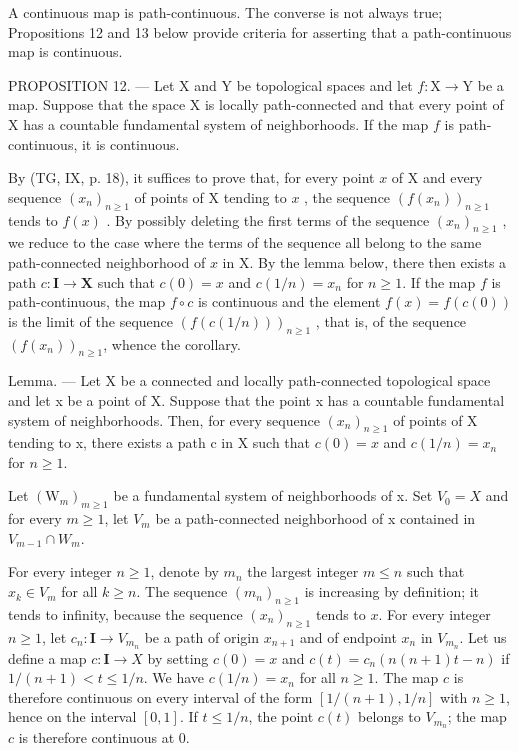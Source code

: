 A continuous map is path-continuous. The converse is not always true; Propositions 12 and 13 below provide criteria for asserting that a path-continuous map is continuous.

PROPOSITION 12. --- Let X and Y be topological spaces and let \(f: \mathrm{X} \to \mathrm{Y}\) be a map. Suppose that the space X is locally path-connected and that every point of X has a countable fundamental system of neighborhoods. If the map \(f\) is path-continuous, it is continuous.

By (TG, IX, p. 18), it suffices to prove that, for every point \(x\) of X and every sequence \((x_n)_{n \geqslant 1}\) of points of X tending to \(x\) , the sequence \((f(x_n))_{n \geqslant 1}\) tends to \(f(x)\) . By possibly deleting the first terms of the sequence \((x_n)_{n \geqslant 1}\) , we reduce to the case where the terms of the sequence all belong to the same path-connected neighborhood of \(x\) in X. By the lemma below, there then exists a path \(c: \mathbf{I} \to \mathbf{X}\) such that \(c(0) = x\) and \(c(1/n) = x_n\) for \(n \geqslant 1\). If the map \(f\) is path-continuous, the map \(f \circ c\) is continuous and the element \(f(x) = f(c(0))\) is the limit of the sequence \((f(c(1/n)))_{n \geqslant 1}\) , that is, of the sequence \((f(x_n))_{n \geqslant 1}\), whence the corollary.

Lemma. --- Let X be a connected and locally path-connected topological space and let x be a point of X. Suppose that the point x has a countable fundamental system of neighborhoods. Then, for every sequence \((x_{n})_{n\geqslant1}\) of points of X tending to x, there exists a path c in X such that \(c(0)=x\) and \(c(1/n)=x_{n}\) for \(n\geqslant1\).

Let \((\mathrm{W}_{m})_{m\geqslant1}\) be a fundamental system of neighborhoods of x. Set \(V_{0}=X\) and for every \(m\geqslant1\), let \(V_{m}\) be a path-connected neighborhood of x contained in \(V_{m-1}\cap W_{m}\).

For every integer \(n \geqslant 1\), denote by \(m_n\) the largest integer \(m \leqslant n\) such that \(x_k \in V_m\) for all \(k \geqslant n\). The sequence \((m_n)_{n \geqslant 1}\) is increasing by definition; it tends to infinity, because the sequence \((x_n)_{n \geqslant 1}\) tends to \(x\). For every integer \(n \geqslant 1\), let \(c_n: \mathbf{I} \to V_{m_n}\) be a path of origin \(x_{n+1}\) and of endpoint \(x_n\) in \(V_{m_n}\). Let us define a map \(c: \mathbf{I} \to X\) by setting \(c(0) = x\) and \(c(t) = c_n(n(n+1)t - n)\) if \(1/(n+1) < t \leqslant 1/n\). We have \(c(1/n) = x_n\) for all \(n \geqslant 1\). The map \(c\) is therefore continuous on every interval of the form \([1/(n+1), 1/n]\) with \(n \geqslant 1\), hence on the interval \([0,1]\). If \(t \leqslant 1/n\), the point \(c(t)\) belongs to \(V_{m_n}\); the map \(c\) is therefore continuous at 0.

